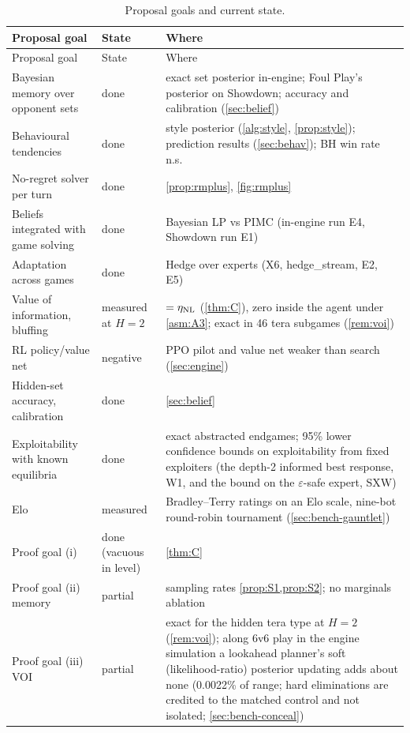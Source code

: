 \documentclass[10pt]{article}
\theoremstyle{plain}
\theoremstyle{definition}
\theoremstyle{remark}
\begin{document}
\begingroup\footnotesize
\begin{longtable}{@{}p{4.6cm}p{2.0cm}p{10.2cm}@{}}
\caption{Proposal goals and current state.}\label{tab:goals}\\
\toprule Proposal goal & State & Where \\ \midrule \endfirsthead
\toprule Proposal goal & State & Where \\ \midrule \endhead
Bayesian memory over opponent sets & done & exact set posterior in-engine; Foul Play's posterior on Showdown; accuracy and calibration (\cref{sec:belief}) \\
Behavioural tendencies & done & style posterior (\cref{alg:style}, \cref{prop:style}); prediction results (\cref{sec:behav}); BH win rate n.s. \\
No-regret solver per turn & done & \cref{prop:rmplus}, \cref{fig:rmplus} \\
Beliefs integrated with game solving & done & Bayesian LP vs PIMC (in-engine run E4, Showdown run E1) \\
Adaptation across games & done & Hedge over experts (X6, hedge\_stream, E2, E5) \\
Value of information, bluffing & measured at $H=2$ & $=\eta_{\rm NL}$ (\cref{thm:C}), zero inside the agent under \cref{asm:A3}; exact in 46 tera subgames (\cref{rem:voi}) \\
RL policy/value net & negative & PPO pilot and value net weaker than search (\cref{sec:engine}) \\
Hidden-set accuracy, calibration & done & \cref{sec:belief} \\
Exploitability with known equilibria & done & exact abstracted endgames; 95\% lower confidence bounds on exploitability from fixed exploiters (the depth-2 informed best response, W1, and the bound on the $\varepsilon$-safe expert, SXW) \\
Elo & measured & Bradley--Terry ratings on an Elo scale, nine-bot round-robin tournament (\cref{sec:bench-gauntlet}) \\
Proof goal (i) & done (vacuous in level) & \cref{thm:C} \\
Proof goal (ii) memory & partial & sampling rates \cref{prop:S1,prop:S2}; no marginals ablation \\
Proof goal (iii) VOI & partial & exact for the hidden tera type at $H=2$ (\cref{rem:voi}); along 6v6 play in the engine simulation a lookahead planner's soft (likelihood-ratio) posterior updating adds about none (0.0022\% of range; hard eliminations are credited to the matched control and not isolated; \cref{sec:bench-conceal}) \\
\bottomrule
\end{longtable}
\endgroup
\end{document}
